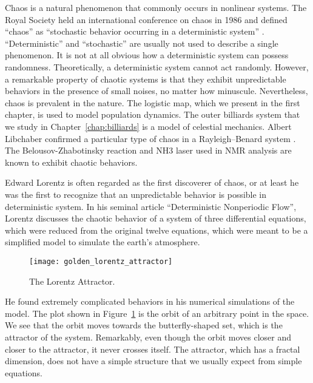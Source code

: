 \documentclass[10pt,twoside]{book}
\begin{document}
Chaos is a natural phenomenon that commonly occurs in nonlinear systems.
The Royal Society held an international conference on chaos in 1986 and defined ``chaos'' as ``stochastic behavior occurring in a deterministic system'' \citep{stewart}.
``Deterministic'' and ``stochastic'' are usually not used to describe a single phenomenon.
It is not at all obvious how a deterministic system can possess randomness.
Theoretically, a deterministic system cannot act randomly.
However, a remarkable property of chaotic systems is that they exhibit unpredictable behaviors in the presence of small noises, no matter how minuscule.
Nevertheless, chaos is prevalent in the nature.
The logistic map, which we present in the first chapter, is used to model population dynamics.
The outer billiards system that we study in Chapter~\ref{chap:billiards} is a model of celestial mechanics.
Albert Libchaber confirmed a particular type of chaos in a Rayleigh–Benard system \citep{libchaber}.
The Belousov-Zhabotinsky reaction \citep{zhang} and NH3 laser used in NMR analysis \citep{kantz-schreiber} are known to exhibit chaotic behaviors.

Edward Lorentz is often regarded as the first discoverer of chaos, or at least he was the first to recognize that an unpredictable behavior is possible in deterministic system.
In his seminal article ``Deterministic Nonperiodic Flow'', Lorentz discusses the chaotic behavior of a system of three differential equations, which were reduced from the original twelve equations, which were meant to be a simplified model to simulate the earth's atmosphere.
\begin{figure}[ht]
  \centering
  \texttt{[image: golden\_lorentz\_attractor]}
  \caption{The Lorentz Attractor.}
  \label{fig:lorentz}
\end{figure}
He found extremely complicated behaviors in his numerical simulations of the model.
The plot shown in Figure~\ref{fig:lorentz} is the orbit of an arbitrary point in the space.
We see that the orbit moves towards the butterfly-shaped set, which is the attractor of the system.
Remarkably, even though the orbit moves closer and closer to the attractor, it never crosses itself.
The attractor, which has a fractal dimension, does not have a simple structure that we usually expect from simple equations.
\end{document}
